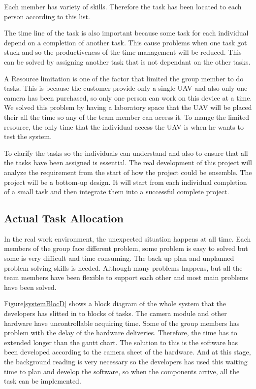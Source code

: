 Each member has variety of skills. Therefore the task has been located to each person according to this list.

The time line of the task is also important because some task for each individual depend on a completion of another task. This cause problems when one task got stuck and so the productiveness of the time management will be reduced. This can be solved by assigning another task that is not dependant on the other tasks. 

A Resource limitation is one of the factor that limited the group member to do tasks. This is because the customer provide only a single UAV and also only one camera has been purchased, so only one person can work on this device at a time. We solved this problem by having a laboratory space that the UAV will be placed their all the time so any of the team member can access it. To mange the limited resource, the only time that the individual access the UAV is when he wants to test the system. 

To clarify the tasks so the individuals can understand and also to ensure that all the tasks have been assigned is essential. The real development of this project will analyze the requirement from the start of how the project could be ensemble. The project will be a bottom-up design. It will start from each individual completion of a small task and then integrate them into a successful complete project. 



\subsection{Actual Task Allocation}

In the real work environment, the unexpected situation happens at all time. Each members of the group face different problem, some problem is easy to solved but some is very difficult and time consuming. The back up plan and unplanned problem solving skills is needed. Although many problems happens, but all the team members have been flexible to support each other and most main problems have been solved.

Figure\ref{systemBlocD} shows a block diagram of the whole system that the developers has slitted in to blocks of tasks. 
The camera module and other hardware have uncontrollable acquiring time. Some of the group members has problem with the delay of the hardware deliveries. Therefore, the time has to extended longer than the gantt chart. The solution to this is the software has been developed according to the camera sheet of the hardware. And at this stage, the background reading is very necessary so the developers has used this waiting time to plan and develop the software, so when the components arrive, all the task can be implemented.

